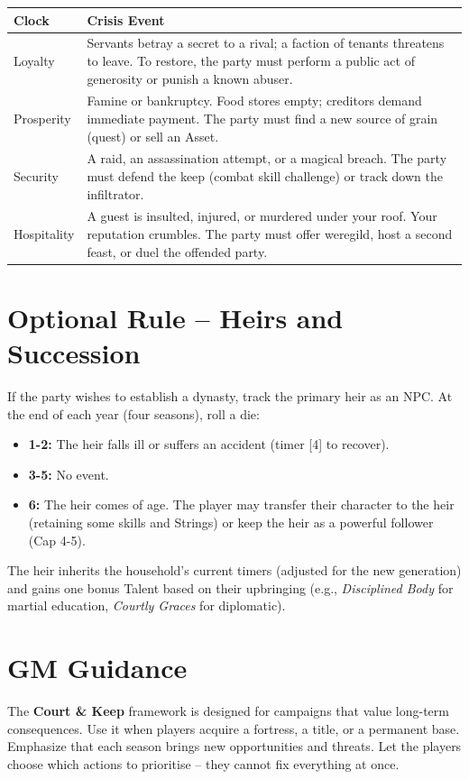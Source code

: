 \documentclass[11pt]{article}
\begin{document}
\begin{longtable}{|p{}|p{}|}
\hline
\textbf{Clock} & \textbf{Crisis Event} \\
\hline
Loyalty & Servants betray a secret to a rival; a faction of tenants threatens to leave. To restore, the party must perform a public act of generosity or punish a known abuser. \\
\hline
Prosperity & Famine or bankruptcy. Food stores empty; creditors demand immediate payment. The party must find a new source of grain (quest) or sell an Asset. \\
\hline
Security & A raid, an assassination attempt, or a magical breach. The party must defend the keep (combat skill challenge) or track down the infiltrator. \\
\hline
Hospitality & A guest is insulted, injured, or murdered under your roof. Your reputation crumbles. The party must offer weregild, host a second feast, or duel the offended party. \\
\hline
\end{longtable}

\section{Optional Rule -- Heirs and Succession}

If the party wishes to establish a dynasty, track the primary heir as an NPC. At the end of each year (four seasons), roll a die:

\begin{itemize}
    \item \textbf{1-2:} The heir falls ill or suffers an accident (timer [4] to recover).
    \item \textbf{3-5:} No event.
    \item \textbf{6:} The heir comes of age. The player may transfer their character to the heir (retaining some skills and Strings) or keep the heir as a powerful follower (Cap 4-5).
\end{itemize}

The heir inherits the household's current timers (adjusted for the new generation) and gains one bonus Talent based on their upbringing (e.g., \textit{Disciplined Body} for martial education, \textit{Courtly Graces} for diplomatic).

\section{GM Guidance}
The \textbf{Court \& Keep} framework is designed for campaigns that value long-term consequences. Use it when players acquire a fortress, a title, or a permanent base. Emphasize that each season brings new opportunities and threats. Let the players choose which actions to prioritise -- they cannot fix everything at once.
\end{document}
